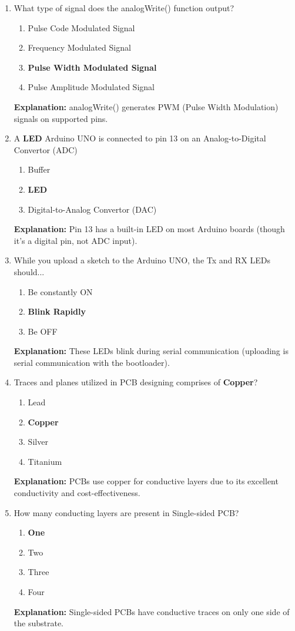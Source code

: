 \documentclass[a4paper,12pt]{article}
\begin{document}
\begin{enumerate}
		\item What type of signal does the analogWrite() function output?
		\begin{enumerate}
			\item Pulse Code Modulated Signal
			\item Frequency Modulated Signal
			\item \textbf{Pulse Width Modulated Signal}
			\item Pulse Amplitude Modulated Signal
		\end{enumerate}
		\textbf{Explanation:} analogWrite() generates PWM (Pulse Width Modulation) signals on supported pins.
		
		\item A \textbf{LED} Arduino UNO is connected to pin 13 on an Analog-to-Digital Convertor (ADC)
		\begin{enumerate}
			\item Buffer
			\item \textbf{LED}
			\item Digital-to-Analog Convertor (DAC)
		\end{enumerate}
		\textbf{Explanation:} Pin 13 has a built-in LED on most Arduino boards (though it's a digital pin, not ADC input).
		
		\item While you upload a sketch to the Arduino UNO, the Tx and RX LEDs should...
		\begin{enumerate}
			\item Be constantly ON
			\item \textbf{Blink Rapidly}
			\item Be OFF
		\end{enumerate}
		\textbf{Explanation:} These LEDs blink during serial communication (uploading is serial communication with the bootloader).
		
		\item Traces and planes utilized in PCB designing comprises of \textbf{Copper}?
		\begin{enumerate}
			\item Lead
			\item \textbf{Copper}
			\item Silver
			\item Titanium
		\end{enumerate}
		\textbf{Explanation:} PCBs use copper for conductive layers due to its excellent conductivity and cost-effectiveness.
		
		\item How many conducting layers are present in Single-sided PCB?
		\begin{enumerate}
			\item \textbf{One}
			\item Two
			\item Three
			\item Four
		\end{enumerate}
		\textbf{Explanation:} Single-sided PCBs have conductive traces on only one side of the substrate.
		

\end{enumerate}
\end{document}
